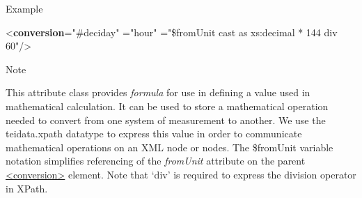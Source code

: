 \begin{reflist}
    \item[{Example}]
  \leavevmode\bgroup{}\exampleFont \begin{shaded}\noindent\mbox{}{<\textbf{conversion}\hspace*{1em}{fromUnit}="{\#deciday}"\mbox{}\newline 
\hspace*{1em}{toUnit}="{hour}"\mbox{}\newline 
\hspace*{1em}{formula}="{\$fromUnit cast as xs:decimal * 144 div 60}"/>}\end{shaded}\egroup 


    \item[{Note}]
  \par
This attribute class provides {\itshape formula} for use in defining a value used in mathematical calculation. It can be used to store a mathematical operation needed to convert from one system of measurement to another. We use the teidata.xpath datatype to express this value in order to communicate mathematical operations on an XML node or nodes. The \$fromUnit variable notation simplifies referencing of the {\itshape fromUnit} attribute on the parent \hyperref[TEI.conversion]{<conversion>} element. Note that ‘div’ is required to express the division operator in XPath.
\end{reflist}  
